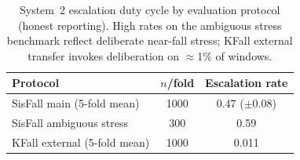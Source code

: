 \begin{table}[!t]
\centering
\caption{System~2 escalation duty cycle by evaluation protocol (honest reporting). High rates on the ambiguous stress benchmark reflect deliberate near-fall stress; KFall external transfer invokes deliberation on $\approx$1\% of windows.}
\label{tab:escalation}
\begin{tabular}{lcc}
\toprule
Protocol & $n$/fold & Escalation rate \\
\midrule
SisFall main (5-fold mean) & 1000 & 0.47 ($\pm$0.08) \\
SisFall ambiguous stress & 300 & 0.59 \\
KFall external (5-fold mean) & 1000 & 0.011 \\
\bottomrule
\end{tabular}
\end{table}

